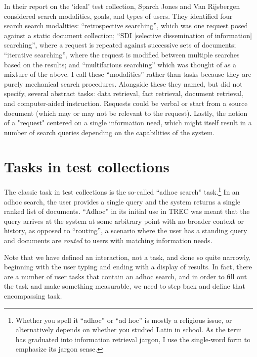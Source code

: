\documentclass[nobib]{tufte-book}
\begin{document}
In their report on the `ideal' test collection, Sparch Jones and Van Rijsbergen considered search modalities, goals, and types of users.  They identified four search search modalities: ``retrospective searching'', which was one request posed against a static document collection; ``SDI [selective dissemination of information] searching'', where a request is repeated against successive sets of documents; ``iterative searching'', where the request is modified between multiple searches based on the results; and ``multifarious searching'' which was thought of as a mixture of the above.\autocite{sparck_jones_report_1975}  I call these ``modalities'' rather than tasks because they are purely mechanical search procedures.  Alongside these they named, but did not specify, several abstract tasks: data retrieval, fact retrieval, document retrieval, and computer-aided instruction.  Requests could be verbal or start from a source document (which may or may not be relevant to the request).  Lastly, the notion of a "request" centered on a single information need, which might itself result in a number of search queries depending on the capabilities of the system.

\section{Tasks in test collections}

The classic task in test collections is the so-called ``adhoc search'' task.\footnote{Whether you spell it ``adhoc'' or ``ad hoc'' is mostly a religious issue, or alternatively depends on whether you studied Latin in school.  As the term has graduated into information retrieval jargon, I use the single-word form to emphasize its jargon sense.}  In an adhoc search, the user provides a single query and the system returns a single ranked list of documents.  ``Adhoc'' in its initial use in TREC was meant that the query arrives at the system at some arbitrary point with no broader context or history, as opposed to ``routing'', a scenario where the user has a standing query and documents are {\em routed} to users with matching information needs.

Note that we have defined an interaction, not a task, and done so quite narrowly, beginning with the user typing and ending with a display of results.  In fact, there are a number of user tasks that contain an adhoc search, and in order to fill out the task and make something measurable, we need to step back and define that encompassing task.
\end{document}
